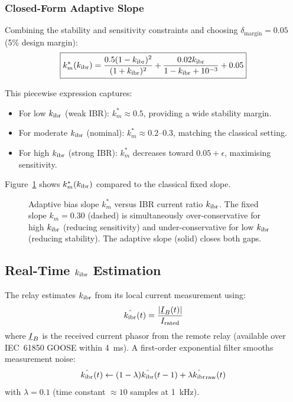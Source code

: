 \subsubsection{Closed-Form Adaptive Slope}

Combining the stability and sensitivity constraints and choosing
$\delta_\mathrm{margin} = 0.05$ (5\% design margin):
\begin{equation}
  \boxed{k_m^\ast(k_\mathrm{ibr}) = \frac{0.5(1 - k_\mathrm{ibr})^2}{(1 + k_\mathrm{ibr})^2}
    + \frac{0.02k_\mathrm{ibr}}{1 - k_\mathrm{ibr} + 10^{-3}} + 0.05}
  \label{eq:ch4_km_formula}
\end{equation}

This piecewise expression captures:
\begin{itemize}
\item For low $k_\mathrm{ibr}$ (weak IBR): $k_m^\ast \approx 0.5$, providing
      a wide stability margin.
\item For moderate $k_\mathrm{ibr}$ (nominal): $k_m^\ast \approx 0.2$--$0.3$,
      matching the classical setting.
\item For high $k_\mathrm{ibr}$ (strong IBR): $k_m^\ast$ decreases toward
      $0.05 + \epsilon$, maximising sensitivity.
\end{itemize}

Figure~\ref{fig:ch4_adaptive_slope} shows $k_m^\ast(k_\mathrm{ibr})$ compared to
the classical fixed slope.

\begin{figure}[htbp]
  \centering
  
  \caption{Adaptive bias slope $k_m^\ast$ versus IBR current ratio $k_\mathrm{ibr}$.
           The fixed slope $k_m = 0.30$ (dashed) is simultaneously
           over-conservative for high $k_\mathrm{ibr}$ (reducing sensitivity) and
           under-conservative for low $k_\mathrm{ibr}$ (reducing stability).
           The adaptive slope (solid) closes both gaps.}
  \label{fig:ch4_adaptive_slope}
\end{figure}

\subsection{Real-Time \texorpdfstring{$k_\mathrm{ibr}$}{k\_ibr} Estimation}

The relay estimates $k_\mathrm{ibr}$ from its local current measurement using:
\begin{equation}
  \hat{k_\mathrm{ibr}}(t) = \frac{|\underline{I}_B(t)|}{I_\mathrm{rated}}
  \label{eq:ch4_kibr_est}
\end{equation}
where $\underline{I}_B$ is the received current phasor from the remote relay
(available over IEC~61850 GOOSE within 4~ms). A first-order exponential
filter smooths measurement noise:
\begin{equation}
  \hat{k_\mathrm{ibr}}(t) \leftarrow (1-\lambda)\hat{k_\mathrm{ibr}}(t-1) + \lambda\hat{k_\mathrm{ibr}}_\mathrm{raw}(t)
  \label{eq:ch4_kibr_filter}
\end{equation}
with $\lambda = 0.1$ (time constant $\approx 10$ samples at 1~kHz).

